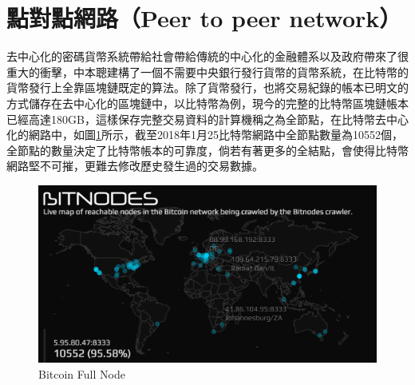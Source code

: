 	\section{點對點網路（Peer to peer network）}

	去中心化的密碼貨幣系統帶給社會帶給傳統的中心化的金融體系以及政府帶來了很重大的衝擊，中本聰建構了一個不需要中央銀行發行貨幣的貨幣系統，在比特幣的貨幣發行上全靠區塊鏈既定的算法。除了貨幣發行，也將交易紀錄的帳本已明文的方式儲存在去中心化的區塊鏈中，以比特幣為例，現今的完整的比特幣區塊鏈帳本已經高達180GB，這樣保存完整交易資料的計算機稱之為全節點，在比特幣去中心化的網路中，如圖\ref{bitcoinfullnode}所示，截至2018年1月25比特幣網路中全節點數量為10552個\supercite{bitcoinfullnode}，全節點的數量決定了比特幣帳本的可靠度，倘若有著更多的全結點，會使得比特幣網路堅不可摧，更難去修改歷史發生過的交易數據。

	\begin{figure}
		\centering
		\includegraphics[width = .9\textwidth]{bitcoinfullnode.png}
		\caption{Bitcoin Full Node\supercite{bitcoinfullnode}}\label{bitcoinfullnode}
	\end{figure}





